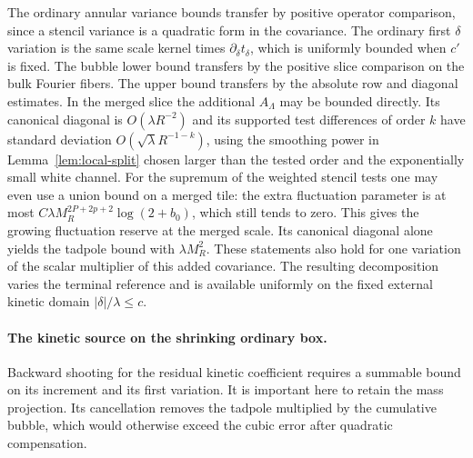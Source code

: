 \documentclass[11pt]{article}
\theoremstyle{definition}
\begin{document}
The ordinary annular variance bounds transfer by positive
operator comparison, since a stencil variance is a quadratic
form in the covariance. The ordinary first \(\delta\) variation
is the same scale kernel times \(\partial_\delta t_\delta\),
which is uniformly bounded when \(c'\) is fixed. The bubble
lower bound transfers by the positive slice comparison on the
bulk Fourier fibers. The upper bound transfers by the absolute
row and diagonal estimates. In the merged slice the additional
\(A_\Lambda\) may be bounded directly. Its canonical diagonal
is \(O(\lambda R^{-2})\) and its supported test differences of
order \(k\) have standard deviation
\(O(\sqrt\lambda R^{-1-k})\), using the smoothing power in
Lemma~\ref{lem:local-split} chosen larger than the tested order
and the exponentially small white channel. For the supremum of
the weighted stencil tests one may even use a union bound on
a merged tile: the extra fluctuation parameter is at most
\(C\lambda M_R^{2P+2p+2}\log(2+b_0)\), which still tends
to zero. This gives the growing fluctuation reserve at the
merged scale. Its canonical diagonal alone yields the
tadpole bound with \(\lambda M_R^{2}\). These statements
also hold for one variation of the scalar multiplier of this
added covariance. The resulting decomposition varies the
terminal reference and is available uniformly on the fixed
external kinetic domain \(|\delta|/\lambda\le c\).

\paragraph{The kinetic source on the shrinking ordinary box.}
Backward shooting for the residual kinetic coefficient requires
a summable bound on its increment and its first variation.
It is important here to retain the mass projection. Its
cancellation removes the tadpole multiplied by the cumulative
bubble, which would otherwise exceed the cubic error after
quadratic compensation.
\end{document}
